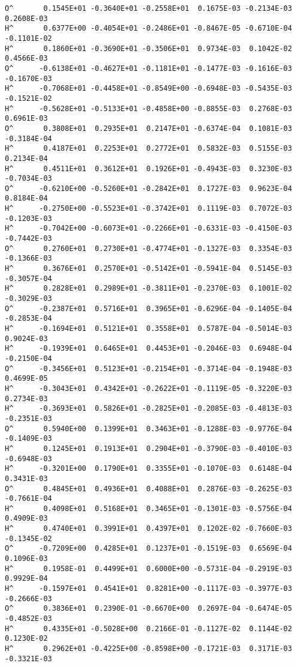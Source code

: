 \begin{verbatim}
O^       0.1545E+01 -0.3640E+01 -0.2558E+01  0.1675E-03 -0.2134E-03  0.2608E-03
H^       0.6377E+00 -0.4054E+01 -0.2486E+01 -0.8467E-05 -0.6710E-04 -0.1101E-02
H^       0.1860E+01 -0.3690E+01 -0.3506E+01  0.9734E-03  0.1042E-02  0.4566E-03
O^      -0.6138E+01 -0.4627E+01 -0.1181E+01 -0.1477E-03 -0.1616E-03 -0.1670E-03
H^      -0.7068E+01 -0.4458E+01 -0.8549E+00 -0.6948E-03 -0.5435E-03 -0.1521E-02
H^      -0.5628E+01 -0.5133E+01 -0.4858E+00 -0.8855E-03  0.2768E-03  0.6961E-03
O^       0.3808E+01  0.2935E+01  0.2147E+01 -0.6374E-04  0.1081E-03 -0.3184E-04
H^       0.4187E+01  0.2253E+01  0.2772E+01  0.5832E-03  0.5155E-03  0.2134E-04
H^       0.4511E+01  0.3612E+01  0.1926E+01 -0.4943E-03  0.3230E-03 -0.7034E-03
O^      -0.6210E+00 -0.5260E+01 -0.2842E+01  0.1727E-03  0.9623E-04  0.8184E-04
H^      -0.2750E+00 -0.5523E+01 -0.3742E+01  0.1119E-03  0.7072E-03 -0.1203E-03
H^      -0.7042E+00 -0.6073E+01 -0.2266E+01 -0.6331E-03 -0.4150E-03 -0.7442E-03
O^       0.2760E+01  0.2730E+01 -0.4774E+01 -0.1327E-03  0.3354E-03 -0.1366E-03
H^       0.3676E+01  0.2570E+01 -0.5142E+01 -0.5941E-04  0.5145E-03 -0.3057E-04
H^       0.2828E+01  0.2989E+01 -0.3811E+01 -0.2370E-03  0.1001E-02 -0.3029E-03
O^      -0.2387E+01  0.5716E+01  0.3965E+01 -0.6296E-04 -0.1405E-04 -0.2853E-04
H^      -0.1694E+01  0.5121E+01  0.3558E+01  0.5787E-04 -0.5014E-03  0.9024E-03
H^      -0.1939E+01  0.6465E+01  0.4453E+01 -0.2046E-03  0.6948E-04 -0.2150E-04
O^      -0.3456E+01  0.5123E+01 -0.2154E+01 -0.3714E-04 -0.1948E-03  0.4699E-05
H^      -0.3043E+01  0.4342E+01 -0.2622E+01 -0.1119E-05 -0.3220E-03  0.2734E-03
H^      -0.3693E+01  0.5826E+01 -0.2825E+01 -0.2085E-03 -0.4813E-03 -0.2351E-03
O^       0.5940E+00  0.1399E+01  0.3463E+01 -0.1288E-03 -0.9776E-04 -0.1409E-03
H^       0.1245E+01  0.1913E+01  0.2904E+01 -0.3790E-03 -0.4010E-03 -0.6948E-03
H^      -0.3201E+00  0.1790E+01  0.3355E+01 -0.1070E-03  0.6148E-04  0.3431E-03
O^       0.4845E+01  0.4936E+01  0.4088E+01  0.2876E-03 -0.2625E-03 -0.7661E-04
H^       0.4098E+01  0.5168E+01  0.3465E+01 -0.1301E-03 -0.5756E-04  0.4909E-03
H^       0.4740E+01  0.3991E+01  0.4397E+01  0.1202E-02 -0.7660E-03 -0.1345E-02
O^      -0.7209E+00  0.4285E+01  0.1237E+01 -0.1519E-03  0.6569E-04  0.1096E-03
H^       0.1958E-01  0.4499E+01  0.6000E+00 -0.5731E-04 -0.2919E-03  0.9929E-04
H^      -0.1597E+01  0.4541E+01  0.8281E+00 -0.1117E-03 -0.3977E-03 -0.2666E-03
O^       0.3836E+01  0.2390E-01 -0.6670E+00  0.2697E-04 -0.6474E-05 -0.4852E-03
H^       0.4335E+01 -0.5028E+00  0.2166E-01 -0.1127E-02  0.1144E-02  0.1230E-02
H^       0.2962E+01 -0.4225E+00 -0.8598E+00 -0.1721E-03  0.3171E-03 -0.3321E-03

\end{verbatim}
